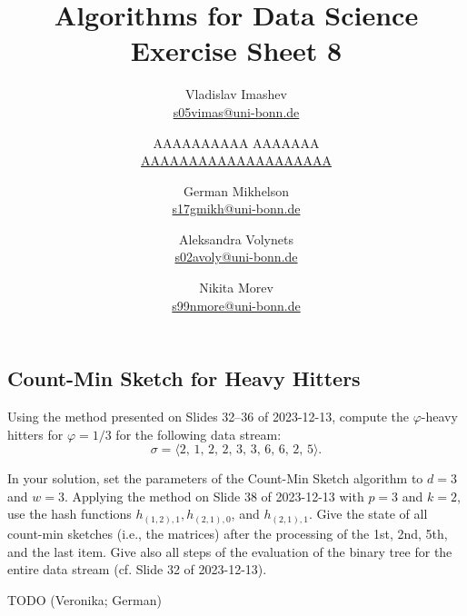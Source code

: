 \documentclass{article}
\title{Algorithms for Data Science \\ Exercise Sheet 8}
\author{
  Vladislav Imashev \\ \href{mailto:s05vimas@uni-bonn.de}{s05vimas@uni-bonn.de} \and
  AAAAAAAAAA AAAAAAA \\ \href{mailto:AAAAAAAAAAAAAAAAAAAA}{AAAAAAAAAAAAAAAAAAAA} \and
  German Mikhelson \\ \href{mailto:s17gmikh@uni-bonn.de}{s17gmikh@uni-bonn.de} \and
  Aleksandra Volynets \\ \href{mailto:s02avoly@uni-bonn.de}{s02avoly@uni-bonn.de} \and
  Nikita Morev \\ \href{mailto:s99nmore@uni-bonn.de}{s99nmore@uni-bonn.de}
}
\let\phi\varphi
\begin{document}
  \maketitle

  \setcounter{section}{8}
  \subsection{Count-Min Sketch for Heavy Hitters}
  \begin{centerframebox}
    Using the method presented on Slides 32--36 of 2023-12-13, compute the $\phi$-heavy
    hitters for $\phi = 1/3$ for the following data stream:
    $$\sigma = \langle2,\, 1,\, 2,\, 2,\, 3,\, 3,\, 6,\, 6,\, 2,\, 5\rangle.$$

    In your solution, set the parameters of the Count-Min Sketch algorithm to $d = 3$
    and $w = 3$. Applying the method on Slide 38 of 2023-12-13 with $p = 3$ and
    $k = 2$, use the hash functions $h_{(1,2),1}, h_{(2,1),0}$, and $h_{(2,1),1}$.
    Give the state of all count-min sketches (i.e., the matrices) after the processing
    of the 1st, 2nd, 5th, and the last item. Give also all steps of the evaluation of
    the binary tree for the entire data stream (cf. Slide 32 of 2023-12-13).
  \end{centerframebox}
  TODO (Veronika; German)
\end{document}
